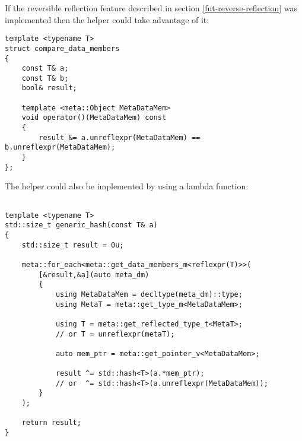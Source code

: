 If the reversible reflection feature described in section \ref{fut-reverse-reflection}
was implemented then the helper could take advantage of it:

\begin{verbatim}
template <typename T>
struct compare_data_members
{
	const T& a;
	const T& b;
	bool& result;

	template <meta::Object MetaDataMem>
	void operator()(MetaDataMem) const
	{
		result &= a.unreflexpr(MetaDataMem) == b.unreflexpr(MetaDataMem);
	}
};
\end{verbatim}

The helper could also be implemented by using a lambda function:

\begin{verbatim}

template <typename T>
std::size_t generic_hash(const T& a)
{
	std::size_t result = 0u;

	meta::for_each<meta::get_data_members_m<reflexpr(T)>>(
		[&result,&a](auto meta_dm)
		{
			using MetaDataMem = decltype(meta_dm)::type;
			using MetaT = meta::get_type_m<MetaDataMem>;

			using T = meta::get_reflected_type_t<MetaT>;
			// or T = unreflexpr(metaT);

			auto mem_ptr = meta::get_pointer_v<MetaDataMem>;

			result ^= std::hash<T>(a.*mem_ptr);
			// or  ^= std::hash<T>(a.unreflexpr(MetaDataMem));
		}
	);

	return result;
}
\end{verbatim}

